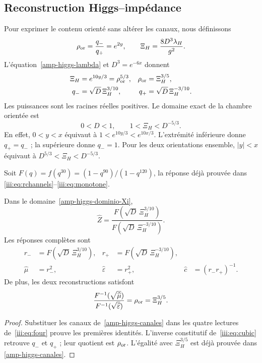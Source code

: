 \subsection{Reconstruction Higgs--impédance}

Pour exprimer le contenu orienté sans altérer les canaux,
nous définissons
\begin{equation}
 \rho_{\rm or}=\frac{q_-}{q_+}=e^{2y},\qquad
 \Xi_H=\frac{8D^3\lambda_H}{g^2}.
 \label{amp-higgs-Xi}
\end{equation}
L’équation~\eqref{amp-higgs-lambda} et $D^3=e^{-6x}$ donnent
\begin{equation}
 \begin{aligned}
 \Xi_H&=e^{10y/3}=\rho_{\rm or}^{5/3},&
 \rho_{\rm or}&=\Xi_H^{3/5},\\
 q_-&=\sqrt D\,\Xi_H^{3/10},&
 q_+&=\sqrt D\,\Xi_H^{-3/10}.
 \end{aligned}
 \label{amp-higgs-canales}
\end{equation}
Les puissances sont les racines réelles positives. Le domaine exact
de la chambre orientée est
\begin{equation}
 0<D<1,\qquad 1<\Xi_H<D^{-5/3}.
 \label{amp-higgs-dominio-Xi}
\end{equation}
En effet, $0<y<x$ équivaut à $1<e^{10y/3}<e^{10x/3}$.
L’extrémité inférieure donne $q_+=q_-$ ; la supérieure donne $q_-=1$.
Pour les deux orientations ensemble, $|y|<x$ équivaut à
$D^{5/3}<\Xi_H<D^{-5/3}$.

Soit $F(q)=f(q^{30})=(1-q^{90})/(1-q^{120})$, la réponse déjà prouvée dans
\eqref{iii:eq:rchannels}--\eqref{iii:eq:monotone}.
\begin{corollary}
\label{amp-higgs-impedancia-corolario}
Dans le domaine~\eqref{amp-higgs-dominio-Xi},
\begin{equation}
 \boxed{\widehat Z=
 \frac{F(\sqrt D\,\Xi_H^{3/10})}
 {F(\sqrt D\,\Xi_H^{-3/10})}.}
 \label{amp-higgs-impedancia}
\end{equation}
Les réponses complètes sont
\begin{equation}
 \begin{aligned}
 r_-&=F(\sqrt D\,\Xi_H^{3/10}),&
 r_+&=F(\sqrt D\,\Xi_H^{-3/10}),\\
 \widehat\mu&=r_-^2,& \widehat\varepsilon&=r_+^2,&
 \widehat c&=(r_-r_+)^{-1}.
 \end{aligned}
 \label{amp-higgs-vacio}
\end{equation}
De plus, les deux reconstructions satisfont
\begin{equation}
 \frac{F^{-1}(\sqrt{\widehat\mu})}
 {F^{-1}(\sqrt{\widehat\varepsilon})}
 =\rho_{\rm or}=\Xi_H^{3/5}.
 \label{amp-higgs-confluencia}
\end{equation}
\end{corollary}
\begin{proof}
Substituer les canaux de~\eqref{amp-higgs-canales} dans les quatre lectures
de~\eqref{iii:eq:four} prouve les premières identités. L’inverse
constitutif de~\eqref{iii:eq:cubic} retrouve $q_-$ et $q_+$ ; leur quotient
est $\rho_{\rm or}$. L’égalité avec $\Xi_H^{3/5}$ est déjà prouvée dans
\eqref{amp-higgs-canales}.
\end{proof}

